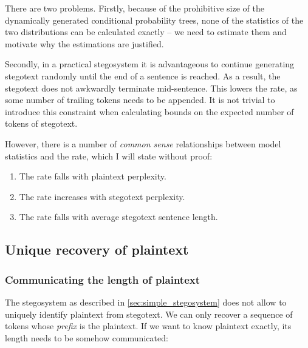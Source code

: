 \documentclass[draft]{IIBproject}
\begin{document}
There are two problems. Firstly, because of the prohibitive size of the dynamically generated conditional probability trees, none of the statistics of the two distributions can be calculated exactly -- we need to estimate them and motivate why the estimations are justified.

Secondly, in a practical stegosystem it is advantageous to continue generating stegotext randomly until the end of a sentence is reached. As a result, the stegotext does not awkwardly terminate mid-sentence. This lowers the rate, as some number of trailing tokens needs to be appended. It is not trivial to introduce this constraint when calculating bounds on the expected number of tokens of stegotext.

However, there is a number of \emph{common sense} relationships between model statistics and the rate, which I will state without proof:

\begin{enumerate}
\item The rate falls with plaintext perplexity.
\item The rate increases with stegotext perplexity.
\item The rate falls with average stegotext sentence length.
\end{enumerate}

\subsection{Unique recovery of plaintext}

\subsubsection{Communicating the length of plaintext}

The stegosystem as described in \cref{sec:simple_stegosystem} does not allow to uniquely identify plaintext from stegotext. We can only recover a sequence of tokens whose \emph{prefix} is the plaintext. If we want to know plaintext exactly, its length needs to be somehow communicated:
\end{document}
